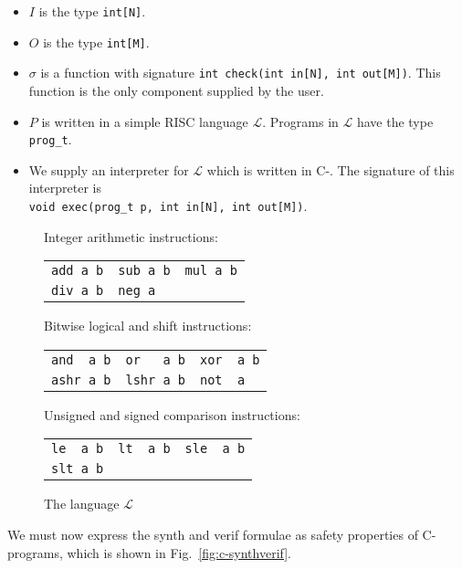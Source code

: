 \documentclass[a4paper]{llncs}
\begin{document}
\begin{itemize}
 \item $I$ is the type \verb|int[N]|.
 \item $O$ is the type \verb|int[M]|.
 \item $\sigma$ is a function with signature
 \verb|int check(int in[N], int out[M])|. This function is the only component supplied
 by the user.
 \item $P$ is written in a simple RISC language $\mathcal{L}$.  Programs in $\mathcal{L}$
 have the type \verb|prog_t|.
 \item We supply an interpreter for $\mathcal{L}$ which is written in C-.  The signature
 of this interpreter is \\
 \verb|void exec(prog_t p, int in[N], int out[M])|.
\end{itemize}

\begin{figure}
\centering
\begin{minipage}{0.65\textwidth}
\setlength{\tabcolsep}{16pt}
Integer arithmetic instructions:

\begin{tabular}{lll}
 \verb|add a b| & \verb|sub a b| & \verb|mul a b| \\
 \verb|div a b| & \verb|neg a|
\end{tabular}
\bigskip

Bitwise logical and shift instructions:

\begin{tabular}{lll}
 \verb|and  a b| & \verb|or   a b| & \verb|xor  a b| \\
 \verb|ashr a b| & \verb|lshr a b| & \verb|not  a|
\end{tabular}
\bigskip

Unsigned and signed comparison instructions:

\begin{tabular}{lll}
 \verb|le  a b| & \verb|lt  a b| & \verb|sle  a b| \\
 \verb|slt a b|
\end{tabular}
\end{minipage}

 \label{fig:l-language}
 \caption{The language $\mathcal{L}$}
\end{figure}

We must now express the {\sc synth} and {\sc verif} formulae as safety properties
of C- programs, which is shown in Fig.~\ref{fig:c-synthverif}.
\end{document}
